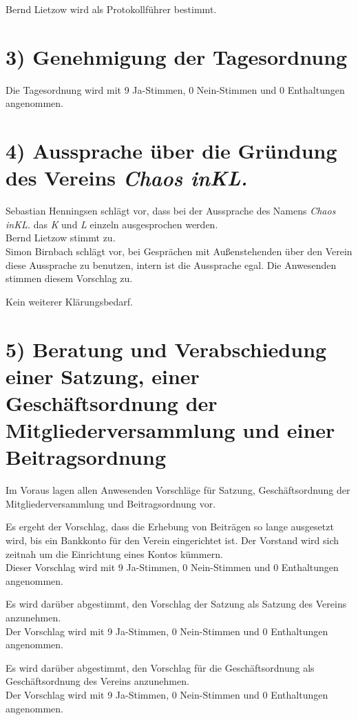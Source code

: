 \documentclass{scrartcl}
\begin{document}
    Bernd Lietzow wird als Protokollführer bestimmt.

\section*{3) Genehmigung der Tagesordnung}


    Die Tagesordnung wird mit 9 Ja-Stimmen, 0 Nein-Stimmen und 0 Enthaltungen angenommen.

\section*{4) Aussprache über die Gründung des Vereins \emph{Chaos inKL.}}

    Sebastian Henningsen schlägt vor, dass bei der Aussprache des Namens
    \emph{Chaos inKL.} das \emph{K} und \emph{L} einzeln ausgesprochen werden.\\
    Bernd Lietzow stimmt zu.\\

    Simon Birnbach schlägt vor, bei Gesprächen mit Außenstehenden über den Verein diese
    Aussprache zu benutzen, intern ist die Aussprache egal. Die Anwesenden stimmen
    diesem Vorschlag zu.

    Kein weiterer Klärungsbedarf.

\section*{5) Beratung und Verabschiedung einer Satzung, einer Geschäftsordnung der
  Mitgliederversammlung und einer Beitragsordnung}

    Im Voraus lagen allen Anwesenden Vorschläge für Satzung, Geschäftsordnung der
    Mitgliederversammlung und Beitragsordnung vor.

    Es ergeht der Vorschlag, dass die Erhebung von Beiträgen so lange ausgesetzt wird,
    bis ein Bankkonto für den Verein eingerichtet ist. Der Vorstand wird sich zeitnah
    um die Einrichtung eines Kontos kümmern.\\
    Dieser Vorschlag wird mit 9 Ja-Stimmen, 0 Nein-Stimmen und 0 Enthaltungen angenommen.

    Es wird darüber abgestimmt, den Vorschlag der Satzung als Satzung des Vereins
    anzunehmen.\\
    Der Vorschlag wird mit 9 Ja-Stimmen, 0 Nein-Stimmen und 0
    Enthaltungen angenommen.

    Es wird darüber abgestimmt, den Vorschlag für die Geschäftsordnung als
    Geschäftsordnung des Vereins anzunehmen.\\
    Der Vorschlag wird mit 9 Ja-Stimmen, 0
    Nein-Stimmen und 0 Enthaltungen angenommen.
\end{document}
